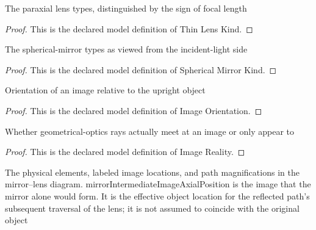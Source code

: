 \begin{definition}
  \label{def:physics:phyx-mini-0034:phyxminiproblems-problemphyxmini0034-thinlenskind}
  The paraxial lens types, distinguished by the sign of focal length
\end{definition}
\begin{proof}
  This is the declared model definition of Thin Lens Kind.
\end{proof}
\begin{definition}
  \label{def:physics:phyx-mini-0034:phyxminiproblems-problemphyxmini0034-sphericalmirrorkind}
  The spherical-mirror types as viewed from the incident-light side
\end{definition}
\begin{proof}
  This is the declared model definition of Spherical Mirror Kind.
\end{proof}
\begin{definition}
  \label{def:physics:phyx-mini-0034:phyxminiproblems-problemphyxmini0034-imageorientation}
  Orientation of an image relative to the upright object
\end{definition}
\begin{proof}
  This is the declared model definition of Image Orientation.
\end{proof}
\begin{definition}
  \label{def:physics:phyx-mini-0034:phyxminiproblems-problemphyxmini0034-imagereality}
  Whether geometrical-optics rays actually meet at an image or only appear to
\end{definition}
\begin{proof}
  This is the declared model definition of Image Reality.
\end{proof}
\begin{definition}
  \label{def:physics:phyx-mini-0034:phyxminiproblems-problemphyxmini0034-mirrorlenssetup}
  The physical elements, labeled image locations, and path magnifications in the mirror--lens diagram. mirrorIntermediateImageAxialPosition is the image that the mirror alone would form. It is the effective object location for the reflected path's subsequent traversal of the lens; it is not assumed to coincide with the original object
\end{definition}
